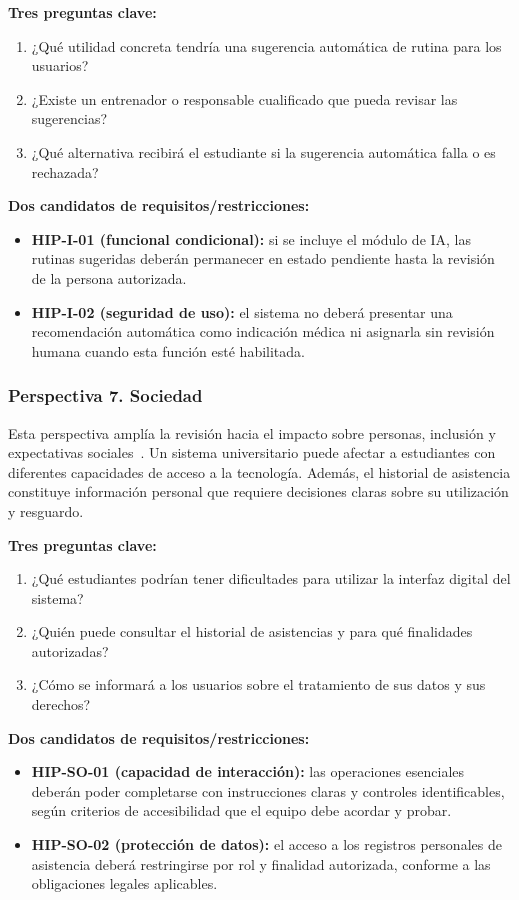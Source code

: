 \textbf{Tres preguntas clave:}
\begin{enumerate}
\item ¿Qué utilidad concreta tendría una sugerencia automática de rutina para los usuarios?
\item ¿Existe un entrenador o responsable cualificado que pueda revisar las sugerencias?
\item ¿Qué alternativa recibirá el estudiante si la sugerencia automática falla o es rechazada?
\end{enumerate}
\textbf{Dos candidatos de requisitos/restricciones:}
\begin{itemize}
\item \textbf{HIP-I-01 (funcional condicional):} si se incluye el módulo de IA, las rutinas sugeridas deberán permanecer en estado pendiente hasta la revisión de la persona autorizada.
\item \textbf{HIP-I-02 (seguridad de uso):} el sistema no deberá presentar una recomendación automática como indicación médica ni asignarla sin revisión humana cuando esta función esté habilitada.
\end{itemize}

\subsubsection{Perspectiva 7. Sociedad}
Esta perspectiva amplía la revisión hacia el impacto sobre personas, inclusión y expectativas sociales~\cite{pohl2025}. Un sistema universitario puede afectar a estudiantes con diferentes capacidades de acceso a la tecnología. Además, el historial de asistencia constituye información personal que requiere decisiones claras sobre su utilización y resguardo.

\textbf{Tres preguntas clave:}
\begin{enumerate}
\item ¿Qué estudiantes podrían tener dificultades para utilizar la interfaz digital del sistema?
\item ¿Quién puede consultar el historial de asistencias y para qué finalidades autorizadas?
\item ¿Cómo se informará a los usuarios sobre el tratamiento de sus datos y sus derechos?
\end{enumerate}
\textbf{Dos candidatos de requisitos/restricciones:}
\begin{itemize}
\item \textbf{HIP-SO-01 (capacidad de interacción):} las operaciones esenciales deberán poder completarse con instrucciones claras y controles identificables, según criterios de accesibilidad que el equipo debe acordar y probar.
\item \textbf{HIP-SO-02 (protección de datos):} el acceso a los registros personales de asistencia deberá restringirse por rol y finalidad autorizada, conforme a las obligaciones legales aplicables.
\end{itemize}

